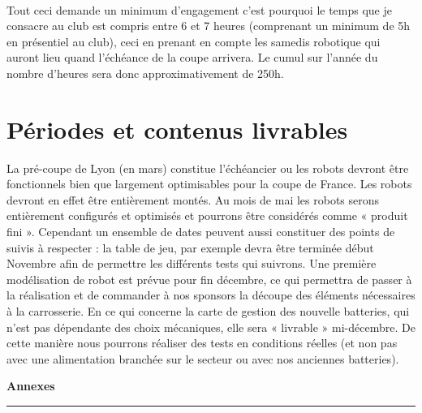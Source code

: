 \documentclass[12pt,a4paper]{article}
\begin{document}
\paragraph{}
Tout ceci demande un minimum d'engagement c'est pourquoi le temps que je consacre au club est compris entre 6 et 7 heures (comprenant un minimum de 5h en présentiel au club), ceci en prenant en compte les samedis robotique qui auront lieu quand l'échéance de la coupe arrivera.
Le cumul sur l'année du nombre d'heures sera donc approximativement de 250h.



\part{Périodes et contenus livrables}
La pré-coupe de Lyon (en mars) constitue l'échéancier ou les robots devront être fonctionnels bien que largement optimisables pour la coupe de France. Les robots devront en effet être entièrement montés. Au mois de mai les robots serons entièrement configurés et optimisés et pourrons être considérés comme « produit fini ». Cependant  un ensemble de dates peuvent aussi constituer des points de suivis à respecter : la table de jeu, par exemple devra être terminée début Novembre afin de permettre les différents tests qui suivrons. Une première modélisation de robot est prévue pour fin décembre, ce qui permettra de passer à la réalisation et de commander à nos sponsors la découpe des éléments nécessaires à la carrosserie. En ce qui concerne la carte de gestion des nouvelle batteries, qui n'est pas dépendante des choix mécaniques, elle sera « livrable » mi-décembre. De cette manière nous pourrons réaliser des tests en conditions réelles (et non pas  avec une alimentation branchée sur le secteur ou avec nos anciennes batteries).
\appendix
\newpage
\begin{center}
\vspace*{10cm}
{\huge\bfseries Annexes\\
[0.4cm]}\rule{\linewidth}{0.5mm}
\end{center}

\newpage

\end{document}
